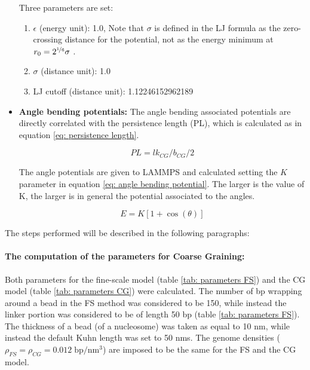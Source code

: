 \begin{itemize}
    Three parameters are set:

    \begin{enumerate} %
        \item $\epsilon$ (energy unit): 1.0, Note that $\sigma$ is defined in the LJ formula as the zero-crossing distance for the potential, not as the energy minimum at $r_0 = 2^{\nicefrac{1}{6}} \sigma$ .
        \item $\sigma$ (distance unit): 1.0
        \item LJ cutoff (distance unit): 1.12246152962189
    \end{enumerate}

    \item \textbf{Angle bending potentials: }The angle bending associated potentials are directly correlated with the persistence length (PL), which is calculated as in equation \ref{eq: persistence length}.

    \begin{equation} \label{eq: persistence length}
        PL = lk_{CG} / b_{CG} / 2
    \end{equation}

    The angle potentials are given to LAMMPS and calculated setting the $K$ parameter in equation \ref{eq: angle bending potential}. The larger is the value of K, the larger is in general the potential associated to the angles.

    \begin{equation} \label{eq: angle bending potential}
        E = K[1 + \cos{(\theta)}]    
    \end{equation}

\end{itemize}


The steps performed will be described in the following paragraphs:


\paragraph{The computation of the parameters for Coarse Graining:}

Both parameters for the fine-scale model (table \ref{tab: parameters FS}) and the CG model (table \ref{tab: parameters CG}) were calculated. The number of bp wrapping around a bead in the FS method was considered to be 150, while instead the linker portion was considered to be of length 50 bp (table \ref{tab: parameters FS}). The thickness of a bead (of a nucleosome) was taken as equal to 10 nm, while instead the default Kuhn length was set to 50 nms. The genome densities ($\rho_{FS} = \rho_{CG} = 0.012\; \text{bp}/\text{nm}^3$) are imposed to be the same for the FS and the CG model.

